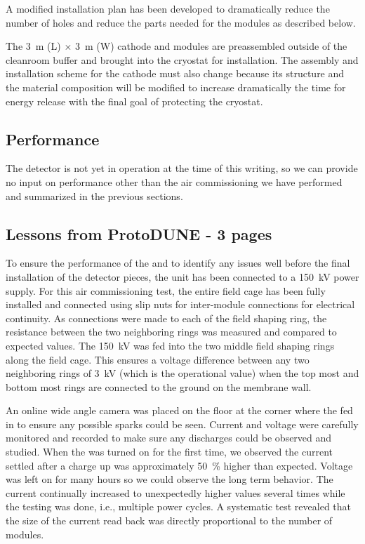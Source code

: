 A modified installation plan has been developed to dramatically reduce the number of \fdth holes and reduce the parts needed for the  modules as described below.

The \SI{3}{\m} (L) $\times$ \SI{3}{\m} (W) cathode and  modules are preassembled outside of the cleanroom buffer and brought into the cryostat for installation.
The assembly and installation scheme for the   cathode must also change because its structure and the material composition will be modified to increase dramatically the time for energy release with the final goal of protecting the cryostat.

\subsection{Performance}
\label{sec:fddp-hv-protodune-lessons-perf}

The  detector is not yet in operation at the time of this writing, so we can provide no input on performance other than the air commissioning we have performed and summarized in the previous sections.

\subsection{Lessons from ProtoDUNE - 3 pages}
\label{sec:fddp-hv-protodune-lessons}
To ensure the performance of the  and to identify any issues well before the final installation of the detector pieces, the  unit has been connected to a \SI{150}{\kV} power supply.
For this air commissioning test, the entire field cage has been fully installed and connected using slip nuts for inter-module connections for electrical continuity.
As connections were made to each of the field shaping ring, the resistance between the two neighboring rings was measured and compared to expected values.
The \SI{150}{\kV}  was fed into the two middle field shaping rings along the field cage. This ensures a voltage difference between any two neighboring rings of \SI{3}{\kV} (which is the operational value) when the top most and bottom most rings are connected to the ground on the membrane wall.

An online wide angle camera was placed on the floor at the corner where the  fed in to ensure any possible sparks could be seen.
Current and voltage were carefully monitored and recorded to make sure any discharges could be observed and studied.
When the  was turned on for the first time, we observed the current settled after a charge up was approximately \num{50}~\% higher than expected.
Voltage was left on for many hours so we could observe the long term behavior.
The current continually increased to unexpectedly higher values several times while the testing was done, i.e., multiple power cycles.
A systematic test revealed that the size of the current read back was directly proportional to the number of  modules.

